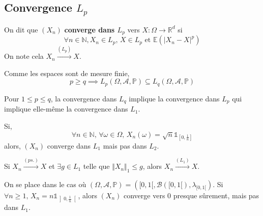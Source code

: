   \subsection{Convergence \texorpdfstring{$L_p$}{Lp}}


  \begin{definition}
    On dit que $(X_n)$ \textbf{converge dans $L_p$} vers $X : \Omega \rightarrow \mathbb{R}^d$ si
    \[ \forall n \in \mathbb{N}, X_n \in L_p, \, X \in L_p \text{ et } \mathbb{E}(\vert X_n - X \vert^p) \]
    On note cela $X_n \overset{(L_p)}{\longrightarrow} X$.
  \end{definition}


  \begin{proposition}
    Comme les espaces sont de mesure finie,
    \[ p \geq q \implies L_p(\Omega, \mathcal{A}, \mathbb{P}) \subseteq L_q(\Omega, \mathcal{A}, \mathbb{P}) \]
  \end{proposition}

  \begin{corollary}
    Pour $1 \leq p \leq q$, la convergence dans $L_q$ implique la convergence dans $L_p$ qui implique elle-même la convergence dans $L_1$.
  \end{corollary}


  \begin{cexample}
    Si,
    \[
      \forall n \in \mathbb{N}, \, \forall \omega \in \Omega, \, X_n(\omega) = \sqrt{n} \mathbb{1}_{\left[ 0, \frac{1}{n} \right]}
    \]
    alors, $(X_n)$ converge dans $L_1$ mais pas dans $L_2$.
  \end{cexample}


  \begin{theorem}
    Si $X_n \overset{(ps.)}{\longrightarrow} X$ et $\exists g \in L_1$ telle que $\Vert X_n \Vert_1 \leq g$, alors $X_n \overset{(L_1)}{\longrightarrow} X$.
  \end{theorem}


  \begin{cexample}
    On se place dans le cas où $(\Omega, \mathcal{A}, \mathbb{P}) = ([0,1[, \mathcal{B}([0,1[), \lambda_{[0,1[})$. Si $\forall n \geq 1, \, X_n = n \mathbb{1}_{\left] 0, \frac{1}{n} \right[}$, alors $(X_n)$ converge vers $0$ presque sûrement, mais pas dans $L_1$.
  \end{cexample}

